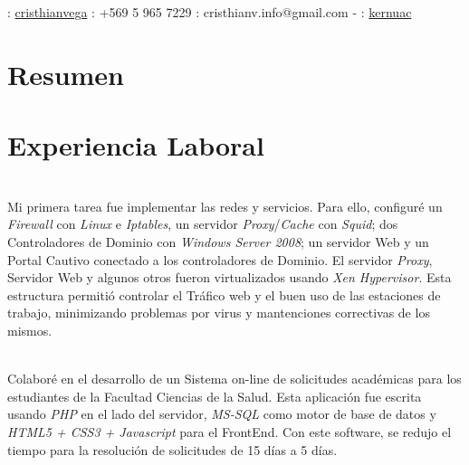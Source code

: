 \documentclass[]{cvStyle1}
\begin{document}
    \begin{header}
        \\
        \\
        \contact
            {\faLinkedin : \href{http://www.linkedin.com/in/cristhianvega}{cristhianvega}}
            {\Mobilefone : +569 5 965 7229}
            {\Letter : cristhianv.info@gmail.com - \faGithub : \href{http://github.com/kernuac}{kernuac}}
    \end{header} 
     
    \section*{Resumen}
        
    \section*{Experiencia Laboral}
        {
            \begin{description}[leftmargin=0cm]
                \item [Administrador de Sistemas] \hfill \\
                Mi primera tarea fue implementar las redes y servicios. 
                Para ello, configur\'e un {\em Firewall} con {\em Linux} e {\em Iptables}, 
                un servidor {\em Proxy}/{\em Cache} con {\em Squid}; dos Controladores 
                de Dominio con {\em Windows Server 2008}; un servidor Web y 
                un Portal Cautivo conectado a los controladores de 
                Dominio. El servidor {\em Proxy}, Servidor Web y algunos otros
                fueron virtualizados usando {\em Xen Hypervisor}. Esta 
                estructura permiti\'o controlar el Tr\'afico web y el buen 
                uso de las estaciones de trabajo, minimizando problemas 
                por virus y mantenciones correctivas de los mismos.

                \item [Desarrollador de Aplicaciones] \hfill \\
                Colabor\'e en el desarrollo de un Sistema on-line de 
                solicitudes acad\'emicas para los estudiantes de la 
                Facultad Ciencias de la Salud. Esta aplicaci\'on fue 
                escrita usando {\em PHP} en el lado del servidor, {\em MS-SQL} 
                como motor de base de datos y {\em HTML5 + CSS3 + Javascript} 
                para el FrontEnd. Con este software, se redujo el tiempo
                para la resoluci\'on de solicitudes de 15 d\'ias a 5 d\'ias.
            
            \end{description}
        }
                     
\end{document}
